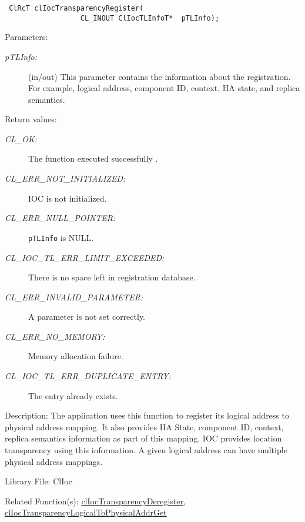 \begin{flushleft}
\begin{Desc}
\footnotesize\begin{verbatim} ClRcT clIocTransparencyRegister(
                  CL_INOUT ClIocTLInfoT*  pTLInfo);
\end{verbatim}
\normalsize
\end{Desc}
\begin{Desc}
\item[Parameters:]
\begin{description}
\item[{\em p\-TLInfo:}](in/out) This parameter contains the information about the registration. For example, logical address, component ID, context, 
HA state, and replica semantics.\end{description}
\end{Desc}
\begin{Desc}
\item[Return values:]
\begin{description}
\item[{\em CL\_\-OK:}]The function executed successfully . \item[{\em CL\_\-ERR\_\-NOT\_\-INITIALIZED:}] IOC is not initialized. 
\item[{\em CL\_\-ERR\_\-NULL\_\-POINTER:}]{\tt{pTLInfo}} is NULL. 
\item[{\em CL\_\-IOC\_\-TL\_\-ERR\_\-LIMIT\_\-EXCEEDED:}]There is no space left in registration database. 
\item[{\em CL\_\-ERR\_\-INVALID\_\-PARAMETER:}]A parameter is not set correctly.
\item[{\em CL\_\-ERR\_\-NO\_\-MEMORY:}]Memory allocation failure. 
\item[{\em CL\_\-IOC\_\-TL\_\-ERR\_\-DUPLICATE\_\-ENTRY:}]The entry already exists.\end{description}
\end{Desc}
\begin{Desc}
\item[Description:]The application uses this function to register its logical address to physical address mapping. It also provides HA State, component
ID, context, replica semantics information as part of this mapping. IOC provides location transparency using this information. A given logical address 
can have multiple physical address mappings.\end{Desc}
\begin{Desc}
\item[Library File:]Cl\-Ioc\end{Desc}
\begin{Desc}
\item[Related Function(s):]\hyperlink{pageioc118}{cl\-Ioc\-Transparency\-Deregister},
\hyperlink{pageioc120}{cl\-Ioc\-Transparency\-Logical\-To\-Physical\-Addr\-Get} \end{Desc}
\newpage



\end{flushleft}
